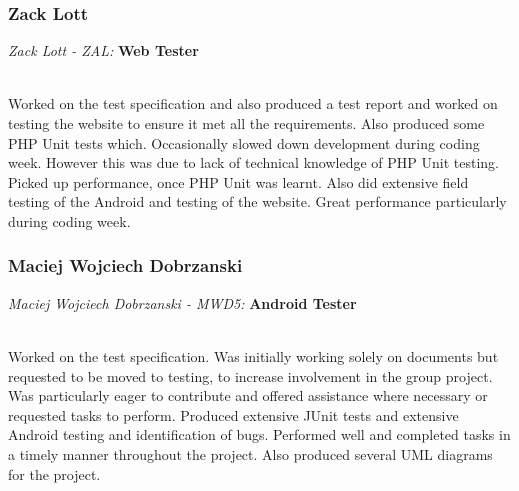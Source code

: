 \documentclass[12pt, portrait]{article}
\begin{document}
\subsubsection{Zack Lott}
\centerline{\emph{Zack Lott - ZAL:}\textbf{ Web Tester}}
~\\
Worked on the test specification and also produced a test report and worked on testing the website to ensure it met all the requirements. Also produced some PHP Unit tests which. Occasionally slowed down development during coding week. However this was due to lack of technical knowledge of PHP Unit testing. Picked up performance, once PHP Unit was learnt. Also did extensive field testing of the Android and testing of the website. Great performance particularly during coding week.
\subsubsection{Maciej Wojciech Dobrzanski}
\centerline{\emph{Maciej Wojciech Dobrzanski - MWD5:}\textbf{ Android Tester}}
~\\
Worked on the test specification. Was initially working solely on documents but requested to be moved to testing, to increase involvement in the group project. Was particularly eager to contribute and offered assistance where necessary or requested tasks to perform. Produced extensive JUnit tests and extensive Android testing and identification of bugs. Performed well and completed tasks in a timely manner throughout the project. Also produced several UML diagrams for the project. 
\newpage
\end{document}
